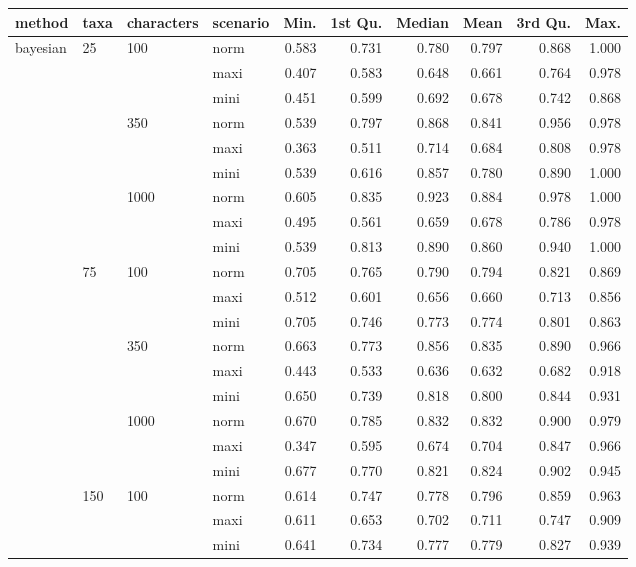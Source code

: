 \begin{longtable}{llllrrrrrr}
  \hline
method & taxa & characters & scenario & Min. & 1st Qu. & Median & Mean & 3rd Qu. & Max. \\ 
  \hline
bayesian & 25 & 100 & norm & 0.583 & 0.731 & 0.780 & 0.797 & 0.868 & 1.000 \\ 
   &  &  & maxi & 0.407 & 0.583 & 0.648 & 0.661 & 0.764 & 0.978 \\ 
   &  &  & mini & 0.451 & 0.599 & 0.692 & 0.678 & 0.742 & 0.868 \\ 
   &  & 350 & norm & 0.539 & 0.797 & 0.868 & 0.841 & 0.956 & 0.978 \\ 
   &  &  & maxi & 0.363 & 0.511 & 0.714 & 0.684 & 0.808 & 0.978 \\ 
   &  &  & mini & 0.539 & 0.616 & 0.857 & 0.780 & 0.890 & 1.000 \\ 
   &  & 1000 & norm & 0.605 & 0.835 & 0.923 & 0.884 & 0.978 & 1.000 \\ 
   &  &  & maxi & 0.495 & 0.561 & 0.659 & 0.678 & 0.786 & 0.978 \\ 
   &  &  & mini & 0.539 & 0.813 & 0.890 & 0.860 & 0.940 & 1.000 \\ 
   & 75 & 100 & norm & 0.705 & 0.765 & 0.790 & 0.794 & 0.821 & 0.869 \\ 
   &  &  & maxi & 0.512 & 0.601 & 0.656 & 0.660 & 0.713 & 0.856 \\ 
   &  &  & mini & 0.705 & 0.746 & 0.773 & 0.774 & 0.801 & 0.863 \\ 
   &  & 350 & norm & 0.663 & 0.773 & 0.856 & 0.835 & 0.890 & 0.966 \\ 
   &  &  & maxi & 0.443 & 0.533 & 0.636 & 0.632 & 0.682 & 0.918 \\ 
   &  &  & mini & 0.650 & 0.739 & 0.818 & 0.800 & 0.844 & 0.931 \\ 
   &  & 1000 & norm & 0.670 & 0.785 & 0.832 & 0.832 & 0.900 & 0.979 \\ 
   &  &  & maxi & 0.347 & 0.595 & 0.674 & 0.704 & 0.847 & 0.966 \\ 
   &  &  & mini & 0.677 & 0.770 & 0.821 & 0.824 & 0.902 & 0.945 \\ 
   & 150 & 100 & norm & 0.614 & 0.747 & 0.778 & 0.796 & 0.859 & 0.963 \\ 
   &  &  & maxi & 0.611 & 0.653 & 0.702 & 0.711 & 0.747 & 0.909 \\ 
   &  &  & mini & 0.641 & 0.734 & 0.777 & 0.779 & 0.827 & 0.939 \\ 

\end{longtable}
